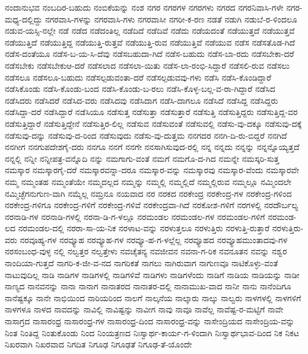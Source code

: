{ನಂದಾನುಭವ
ನಂಬದಿರ-ಬಹುದು
ನಂಬಿಕೆಯನ್ನು
ನಂಶ
ನಗರ
ನಗರಗಳ
ನಗರಗಳು
ನಗರದ
ನಗರನಿವಾಸಿ-ಗಳೇ
ನಗರ-ಮಧ್ಯ-ದಲ್ಲಿದ್ದು
ನಗರವಾಸಿ-ಗಳನ್ನು
ನಗರವಾಸಿ-ಗಳು
ನಗರವಾಸೀ
ನಗರೀ-ಕ-ರಣ
ನಡತೆ
ನಡುಗಿ
ನಡುಬೆ-ರ-ಳಿಂದಲೂ
ನಡುವ-ಯಸ್ಸಿ-ನಲ್ಲೇ
ನಡೆ
ನಡೆದ
ನಡೆದಂತಿಲ್ಲ
ನಡೆದಿದೆ
ನಡೆದಿವೆ
ನಡೆದು
ನಡೆಯದಂತೆ
ನಡೆಯುತ್ತದೆ
ನಡೆಯುತ್ತವೆ
ನಡೆಯುತ್ತಿದೆ
ನಡೆಯುತ್ತಿದ್ದ
ನಡೆಯುತ್ತಿ-ರುತ್ತವೆ
ನಡೆಯುತ್ತಿ-ರುವ
ನಡೆಯುತ್ತಿವೆ
ನಡೆಯುವ
ನಡೆಸ
ನಡೆಸತೊಡ-ಗಿದೆ
ನಡೆಸ-ದಂತೆಯೂ
ನಡೆಸ-ಬ-ಯ-ಸಿ-ದೆವು
ನಡೆಸಬಹುದಾ-ಗಿದೆ
ನಡೆಸ-ಬಹುದು
ನಡೆಸ-ಬಾ-ರದು
ನಡೆಸಬೇಕಾ-ದರೆ
ನಡೆಸಬೇಕು
ನಡೆಸಬೇಕುಆ-ದರೆ
ನಡೆಸಲಾದ
ನಡೆಸಲಾ-ಯಿತು
ನಡೆಸ-ಲಾ-ರಂಭಿ-ಸಿದ್ದಾರೆ
ನಡೆಸಲಿ-ರುವ
ನಡೆಸಲು
ನಡೆಸಲೂ
ನಡೆಸಲೂ-ಬಹುದು
ನಡೆಸಲ್ಪಡುವಂತಾ-ದರೆ
ನಡೆಸಲ್ಪಡುವವು-ಗಳು
ನಡೆಸಿ
ನಡೆಸಿ-ಕೊಂಡಿದ್ದಾರೆ
ನಡೆಸಿಕೊಂಡು
ನಡೆಸಿ-ಕೊಂಡು-ಬಂದ
ನಡೆಸಿ-ಕೊಂಡು-ಬ-ರಲು
ನಡೆಸಿ-ಕೊಳ್ಳ-ಬಲ್ಲ-ವ-ರಾ-ಗಿದ್ದಾರೆ
ನಡೆಸಿದ
ನಡೆಸಿದರು
ನಡೆಸಿದರೆ
ನಡೆಸಿದ-ವರು
ನಡೆಸಿದವು
ನಡೆಸಿದಾಗ
ನಡೆಸಿ-ದಾಗಲೂ
ನಡೆಸಿದೆ
ನಡೆಸಿದ್ದ
ನಡೆಸಿದ್ದರು
ನಡೆಸಿದ್ದಾ-ದರೆ
ನಡೆಸಿದ್ದಾರೆ
ನಡೆಸಿಯೂ
ನಡೆಸುತ್ತ
ನಡೆಸುತ್ತಾ
ನಡೆಸುತ್ತಾರೆ
ನಡೆಸುತ್ತಿ
ನಡೆಸುತ್ತಿದ್ದರು
ನಡೆಸುತ್ತಿದ್ದ-ವರ
ನಡೆಸುತ್ತಿದ್ದಾರೆ
ನಡೆಸುತ್ತಿದ್ದೇನೆ
ನಡೆಸುತ್ತಿರ-ಲಿಲ್ಲ
ನಡೆಸುವ
ನಡೆಸುವಂತೆ
ನಡೆಸುವಲ್ಲಿ
ನಡೆಸು-ವು-ದಕ್ಕೂ
ನಡೆಸುವು-ದಕ್ಕೆ
ನಡೆಸುವು-ದನ್ನು
ನಡೆಸುವು-ದ-ರಿಂದ
ನಡೆಸುವುದು
ನಡೆಸು-ವು-ದುತ್ತಮ
ನನಗದರ
ನನಗಿ-ದಿ-ರು-ಬಿದ್ದರೆ
ನನಗಿದೆ
ನನಗೀಗ
ನನಗುಪದೇಶಗೈ-ದರು
ನನಗೂ
ನನಗೆ
ನನಗೇ
ನನಸಾಗಿಸುವುದ-ರಲ್ಲಿ
ನನ್ನ
ನನ್ನದು
ನನ್ನನ್ನು
ನನ್ನನ್ನೊಯ್ಯತ್ತದೆ
ನನ್ನಲ್ಲಿ
ನನ್ನೀ
ನನ್ನೀಪತ್ರ-ವನ್ನೊದಿ
ನನ್ನು
ನಮಗಾಗು-ವಂತೆ
ನಮಗೆ
ನಮಗೊ-ದ-ಗಿದ
ನಮನ್ನೇ
ನಮಸ್ಕರಿ-ಸುತ್ತ
ನಮಸ್ಕಾರ
ನಮಸ್ಕಾರಗೈ-ದರೆ
ನಮಸ್ಕಾರವನ್ನಾ-ದರೂ
ನಮಸ್ಕಾರ-ವನ್ನು
ನಮಸ್ಕಾರವು
ನಮಸ್ಕಾರ-ವೆಂದು
ನಮಸ್ಕಾರವೇ
ನಮ್ಮ
ನಮ್ಮಂತಹ
ನಮ್ಮಂತೆಯೇ
ನಮ್ಮದಲ್ಲದ
ನಮ್ಮನ್ನು
ನಮ್ಮಲ್ಲಿ
ನಮ್ಮಲ್ಲಿದೆ
ನಮ್ಮಲ್ಲಿರುವ
ನಮ್ಮಲ್ಲೂ
ನಮ್ಮಿಂದಲೇ
ನಮ್ಮಿಚ್ಛೆಗನುಗುಣ-ವಾಗಿ
ನಮ್ಮೆಲ್ಲ
ನಮ್ರನೂ
ನಯವಾದ
ನರ
ನರಕದ
ನರಕೇಂದ್ರ
ನರಕೇಂದ್ರ-ಗಳ
ನರಕೇಂದ್ರ-ಗಳಿಂದ
ನರಕೇಂದ್ರ-ಗಳಿಗೂ
ನರಕೇಂದ್ರ-ಗಳಿಗೆ
ನರಕೇಂದ್ರ-ಗಳಿವೆ
ನರಕೇಂದ್ರವಾ-ಗಿದೆ
ನರಕೋಶ-ಗಳಿಗೆ
ನರಗಳಲ್ಲಿ
ನರದೌರ್ಬಲ್ಯ
ನರನಾಡಿ-ಗಳ
ನರನಾಡಿ-ಗಳಲ್ಲಿ
ನರನಾ-ಡಿ-ಗ-ಳಲ್ಲೂ
ನರಮಂಡಲ
ನರಮಂಡಲ-ಗಳ
ನರಮಂಡಲ-ಗಳಿಗೆ
ನರಮಂಡ-ಲದ
ನರಮಂಡಲ-ದಲ್ಲಿ
ನರರಾ-ಸಾ-ಯ-ನಿಕ
ನರಳಾಟ-ವನ್ನು
ನರಳುತ್ತಲೂ
ನರಳುತ್ತಿರು
ನರಳುತ್ತಿ-ರುತ್ತಾರೆ
ನರಳುತ್ತಿರು-ವರು
ನರವೂಹ್ಯ-ಗಳ
ನರವ್ಯೂಹ
ನರವ್ಯೂಹ-ಗಳ
ನರವ್ಯೂ-ಹ-ಗ-ಳಲ್ಲೆಲ್ಲ
ನರವ್ಯೂಹದ
ನರವ್ಯೂಹಮುಂತಾದವು-ಗಳ
ನರಸಂಬಂಧ-ವುಳ್ಳ
ನಲ್ಲಿ
ನಲ್ವತ್ತರ
ನಲ್ವತ್ತೇಳು
ನವಚೈತನ್ಯ
ನವಜೀವನ
ನವನಾ-ಗ-ರಿಕ
ನವನೂತನ
ನವನ್ನು
ನಶ್ವರ
ನಾಂದಿಯಾ-ಗುತ್ತದೆ
ನಾಗರಿ-ಕ-ಜೀ-ವ-ನದ
ನಾಗರಿಕತೆ
ನಾಗಲು
ನಾಗಿರುವಾಗ
ನಾಗುಣವೂ
ನಾಟಿಕೊಳ್ಳು-ವಂತೆ
ನಾಟುವುದಿಲ್ಲ
ನಾಡಿ
ನಾಡಿಗಳ
ನಾಡಿಗಳಲ್ಲಿ
ನಾಡಿಗಳಿವೆ
ನಾಡಿಗಳು
ನಾಡಿಗಳೆಂದು
ನಾಡಿಗೆ
ನಾಡಿಯ
ನಾಡಿಯನ್ನು
ನಾಡೀ
ನಾಣ್ಯದ
ನಾನವನನ್ನು
ನಾನಾ
ನಾನಾಗ
ನಾನಾತರದ
ನಾನಾತರ-ದಲ್ಲಿ
ನಾನಾಮುಖ-ವಾದ
ನಾನೀ
ನಾನು
ನಾನೆಂದಿಗೂ
ನಾನೆಷ್ಟಕ್ಕೂ
ನಾನೇ
ನಾಭಿಯಿಂದ
ನಾರಿಯರಿಂದ
ನಾಲಗೆ
ನಾಲ್ಕನೆಯ
ನಾಲ್ಕಾರು
ನಾಲ್ಕು
ನಾಲ್ವರು
ನಾಳಗಳಲ್ಲಿ
ನಾಳಗಳಿಗೆ
ನಾಳಗಳೂ
ನಾಳದ
ನಾವದನ್ನು
ನಾವಿಲ್ಲಿ
ನಾವಿಷ್ಟನ್ನು
ನಾವೀಗ
ನಾವು
ನಾವೂ
ನಾವೆಲ್ಲ
ನಾವೆಷ್ಟ-ರ-ಮಟ್ಟಿಗೆ
ನಾವೇ
ನಾಸಾಗ್ರದ
ನಾಸಾರಂಧ್ರ
ನಾಸಾರಂಧ್ರ-ಗಳ
ನಾಸಾರಂಧ್ರ-ದಿಂದ
ನಾಸಾರಂಧ್ರ-ವನ್ನು
ನಾಸೇಂದ್ರಿಯದ
ನಾಸೇಂದ್ರಿಯ-ವನ್ನು
ನಿಂತ
ನಿಂತಿದ್ದ
ನಿಂತುಕೊಂಡು
ನಿಂದ
ನಿಂಯತ್ರಣದ
ನಿಃಸ್ವಾರ್ಥ-ಕಾರ್ಯ-ಗ-ಳಿಂದಾಗಿ
ನಿಃಸ್ವಾರ್ಥಭಾವ-ದಿಂದ
ನಿಕ
ನಿಕಟ
ನಿಖರವಾಗಿ
ನಿಖರವಾದ
ನಿಗದಿತ
ನಿಗೂಢ
ನಿಗೂಢತೆ
ನಿಗೂಢ-ತೆ-ಯೊಂದೇ
}
